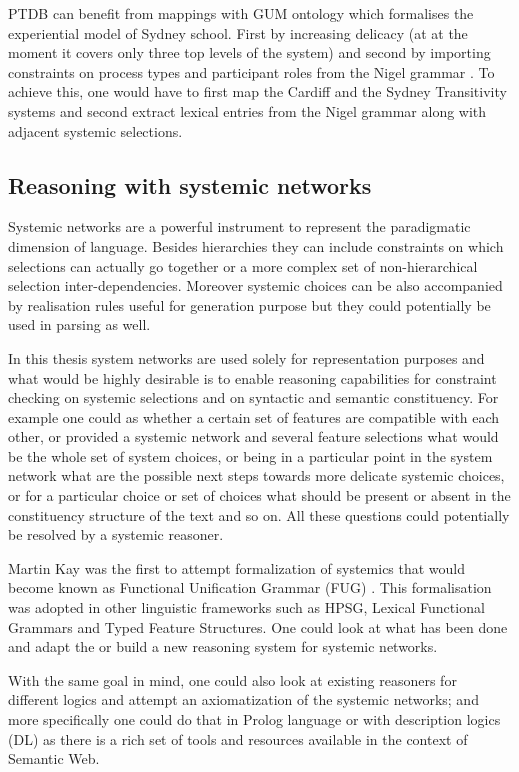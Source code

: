     PTDB can benefit from mappings with GUM ontology which formalises the experiential model of Sydney school. First by increasing delicacy (at at the moment it covers only three top levels of the system) and second by importing constraints on process types and participant roles from the Nigel grammar \citep{Matthiessen1985}. To achieve this, one would have to first map the Cardiff and the Sydney Transitivity systems and second extract lexical entries from the Nigel grammar along with adjacent systemic selections. 

\subsection{Reasoning with systemic networks}
    Systemic networks are a powerful instrument to represent the paradigmatic dimension of language. Besides hierarchies they can include constraints on which selections can actually go together or a more complex set of non-hierarchical selection inter-dependencies. Moreover systemic choices can be also accompanied by realisation rules useful for generation purpose but they could potentially be used in parsing as well. 

    In this thesis system networks are used solely for representation purposes and what would be highly desirable is to enable reasoning capabilities for constraint checking on systemic selections and on syntactic and semantic constituency. For example one could as whether a certain set of features are compatible with each other, or provided a systemic network and several feature selections what would be the whole set of system choices, or being in a particular point in the system network what are the possible next steps towards more delicate systemic choices, or for a particular choice or set of choices what should be present or absent in the constituency structure of the text and so on. All these questions could potentially be resolved by a systemic reasoner. 

    Martin Kay was the first to attempt formalization of systemics that would become known as Functional Unification Grammar (FUG) \citep{Kay1985}. This formalisation was adopted in other linguistic frameworks such as HPSG, Lexical Functional Grammars and Typed Feature Structures. One could look at what has been done and adapt the or build a new reasoning system for systemic networks. 

    With the same goal in mind, one could also look at existing reasoners for different logics and attempt an axiomatization of the systemic networks; and more specifically one could do that in Prolog language or with description logics (DL) as there is a rich set of tools and resources available in the context of Semantic Web.


